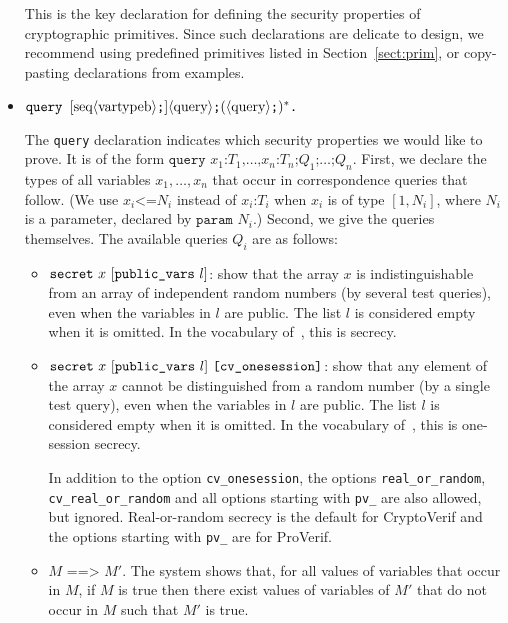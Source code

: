 \begin{itemize}
\begin{itemize}
\end{itemize}


\fi


This is the key declaration for defining the security properties of
cryptographic primitives. Since such declarations are delicate to
design, we recommend using predefined primitives listed in
Section~\ref{sect:prim}, or copy-pasting declarations from examples.

\item $\texttt{query }[\textrm{seq}\langle\textrm{vartypeb}\rangle\texttt{;}]\langle\textrm{query}\rangle\texttt{;} (\langle\textrm{query}\rangle\texttt{;})^* \texttt{.}$

The {\tt query} declaration indicates which security properties we 
would like to prove. It is of the form $\texttt{query }x_1\texttt{:}T_1\texttt{,} \ldots\texttt{,} x_n\texttt{:}T_n\texttt{;} Q_1\texttt{;} \dots\texttt{;}Q_n$. First, we declare the types of all variables $x_1, \ldots, x_n$
that occur in correspondence queries that follow. (We use $x_i \texttt{<=} N_i$ instead of
  $x_i\texttt{:} T_i$ when $x_i$ is of type $[1,N_i]$, where $N_i$ is
  a parameter, declared by $\texttt{param }N_i$.) Second, we give the queries themselves. The available queries $Q_i$ are as follows:
\begin{itemize}

\item ${\tt secret}\ x\ [\texttt{public\_vars}\ l]$: show that the array $x$ is indistinguishable
from an array of independent random numbers (by several test queries),
even when the variables in $l$ are public. The list $l$ is considered empty when it is omitted.
In the vocabulary of~\cite{BlanchetEPrint05}, this is secrecy.

\item ${\tt secret}\ x\ [\texttt{public\_vars}\ l]\ \texttt{[cv\_onesession]}$: 
show that any element of the array $x$ 
cannot be distinguished from a random number (by a single test query),
even when the variables in $l$ are public. The list $l$ is considered empty when it is omitted.
In the vocabulary of~\cite{BlanchetEPrint05}, this is one-session
secrecy.

In addition to the option \texttt{cv\_onesession}, the options \texttt{real\_or\_random},
\texttt{cv\_real\_or\_random} and all options starting with \texttt{pv\_} are also allowed,
but ignored. Real-or-random secrecy is the default for CryptoVerif and
the options starting with \texttt{pv\_} are for ProVerif.

\item $M \texttt{ ==> } M'$.
The system shows that, for all values of variables that occur in $M$,
if $M$ is true then there exist values of variables of $M'$ that do not
occur in $M$ such that $M'$ is true.


\end{itemize}
\end{itemize}
